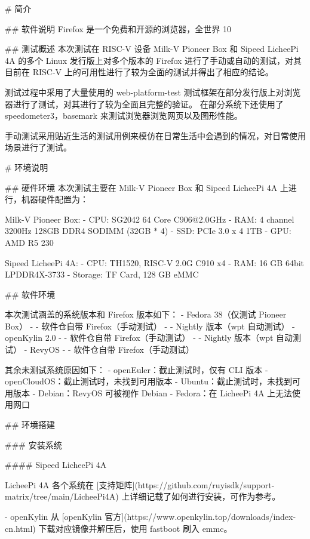 \documentclass{article}
\begin{document}
\begin{markdown}

# 简介

## 软件说明
Firefox 是一个免费和开源的浏览器，全世界 10%

## 测试概述
本次测试在 RISC-V 设备 Milk-V Pioneer Box 和 Sipeed LicheePi 4A 的多个 Linux 发行版上对多个版本的 Firefox 进行了手动或自动的测试，对其目前在 RISC-V 上的可用性进行了较为全面的测试并得出了相应的结论。

测试过程中采用了大量使用的 web-platform-test 测试框架在部分发行版上对浏览器进行了测试，对其进行了较为全面且完整的验证。
在部分系统下还使用了 speedometer3，basemark 来测试浏览器浏览网页以及图形性能。

手动测试采用贴近生活的测试用例来模仿在日常生活中会遇到的情况，对日常使用场景进行了测试。

# 环境说明

## 硬件环境
本次测试主要在 Milk-V Pioneer Box 和 Sipeed LicheePi 4A 上进行，机器硬件配置为：

Milk-V Pioneer Box:
- CPU: SG2042 64 Core C906@2.0GHz
- RAM: 4 channel 3200Hz 128GB DDR4 SODIMM (32GB $*$ 4)
- SSD: PCIe 3.0 x 4 1TB
- GPU: AMD R5 230

Sipeed LicheePi 4A:
- CPU: TH1520, RISC-V 2.0G C910 x4
- RAM: 16 GB 64bit LPDDR4X-3733
- Storage: TF Card, 128 GB eMMC

## 软件环境

本次测试涵盖的系统版本和 Firefox 版本如下：
- Fedora 38（仅测试 Pioneer Box）
- - 软件仓自带 Firefox（手动测试）
- - Nightly 版本（wpt 自动测试）
- openKylin 2.0
- - 软件仓自带 Firefox（手动测试）
- - Nightly 版本（wpt 自动测试）
- RevyOS
- - 软件仓自带 Firefox（手动测试）

其余未测试系统原因如下：
- openEuler：截止测试时，仅有 CLI 版本
- openCloudOS：截止测试时，未找到可用版本
- Ubuntu：截止测试时，未找到可用版本
- Debian：RevyOS 可被视作 Debian
- Fedora：在 LicheePi 4A 上无法使用网口

## 环境搭建


### 安装系统

#### Sipeed LicheePi 4A

LicheePi 4A 各个系统在 [支持矩阵](https://github.com/ruyisdk/support-matrix/tree/main/LicheePi4A) 上详细记载了如何进行安装，可作为参考。

- openKylin
从 [openKylin 官方](https://www.openkylin.top/downloads/index-cn.html) 下载对应镜像并解压后，使用 fastboot 刷入 emmc。


\end{markdown}
\end{document}
